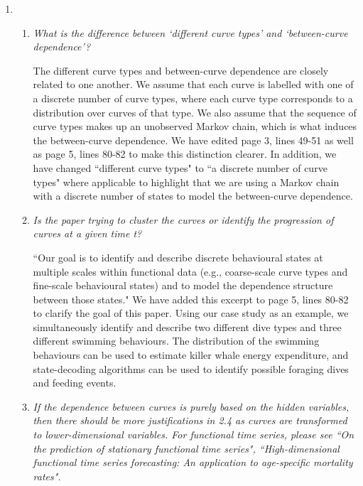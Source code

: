 \documentclass{article}
\begin{document}
\begin{enumerate}
    \item 
    \begin{enumerate}
        \item \textit{What is the difference between `different curve types' and `between-curve dependence'?} 
        
        The different curve types and between-curve dependence are closely related to one another. We assume that each curve is labelled with one of a discrete number of curve types, where each curve type corresponds to a distribution over curves of that type. We also assume that the sequence of curve types makes up an unobserved Markov chain, which is what induces the between-curve dependence. We have edited page 3, lines 49-51 as well as page 5, lines 80-82 to make this distinction clearer. In addition, we have changed ``different curve types" to ``a discrete number of curve types" where applicable to highlight that we are using a Markov chain with a discrete number of states to model the between-curve dependence. 
        
        \item \textit{Is the paper trying to cluster the curves or identify the progression of curves at a given time t?} 
        
        ``Our goal is to identify and describe discrete behavioural states at multiple scales within functional data (e.g., coarse-scale curve types and fine-scale behavioural states) and to model the dependence structure between those states." We have added this excerpt to page 5, lines 80-82 to clarify the goal of this paper. Using our case study as an example, we simultaneously identify and describe two different dive types and three different swimming behaviours. The distribution of the swimming behaviours can be used to estimate killer whale energy expenditure, and state-decoding algorithms can be used to identify possible foraging dives and feeding events.
        
        \item \textit{If the dependence between curves is purely based on the hidden variables, then there should be more justifications in 2.4 as curves are transformed to lower-dimensional variables. For functional time series, please see ``On the prediction of stationary functional time series", ``High-dimensional functional time series forecasting: An application to age-specific mortality rates".} 
        

\end{enumerate}
\end{enumerate}
\end{document}

